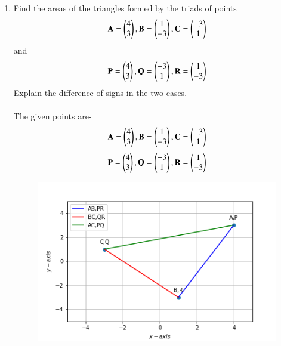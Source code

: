 \documentclass[journal,12pt,twocolumn]{IEEEtran}
\renewcommand\thesection{\arabic{section}}
\begin{document}
\newpage
\bigskip
\renewcommand{\thefigure}{\theenumi}
\renewcommand{\thetable}{\theenumi}
\renewcommand{\theequation}{\theenumi}
\begin{enumerate}[label=\thesection.\arabic*.,ref=\thesection.\theenumi]
\section{PROBLEM}
\item Find the areas of the triangles formed by the triads of points 
\begin{align}
\mathbf{A} = \begin{pmatrix}4\\3\end{pmatrix}, \mathbf{B} =\begin{pmatrix}1\\-3\end{pmatrix}, \mathbf{C} =\begin{pmatrix}-3\\1\end{pmatrix}
\end{align} and
\begin{align}
\mathbf{P} =\begin{pmatrix}4\\3\end{pmatrix}, \mathbf{Q} =\begin{pmatrix}-3\\1\end{pmatrix}, \mathbf{R} =\begin{pmatrix}1\\-3\end{pmatrix} 
\end{align} Explain the difference of signs in the two cases.\\\\
\solution
The given points are-
\begin{align}
\mathbf{A} = \begin{pmatrix}4\\3\end{pmatrix}, \mathbf{B} =\begin{pmatrix}1\\-3\end{pmatrix}, \mathbf{C} =\begin{pmatrix}-3\\1\end{pmatrix}
\end{align}
\begin{align}
\mathbf{P} =\begin{pmatrix}4\\3\end{pmatrix}, \mathbf{Q} =\begin{pmatrix}-3\\1\end{pmatrix}, \mathbf{R} =\begin{pmatrix}1\\-3\end{pmatrix} 
\end{align}
\begin{figure}[!ht]
    \centering
    \includegraphics[width=\columnwidth]{triangle.png}

\end{figure}
\end{enumerate}
\end{document}
